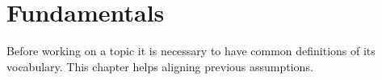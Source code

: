 \chapter{Fundamentals}


Before working on a topic it is necessary to have common definitions of its vocabulary. This chapter helps aligning previous assumptions.
